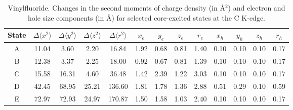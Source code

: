 \documentclass[journal=jctcce,manuscript=article]{achemso}
\begin{document}
 \begin{table}[H]
 \centering
 \caption{Vinylfluoride. Changes in the 
   second moments of charge density (in \AA$^2$) 
   and electron and hole size components (in \AA) for  selected core-excited states at the C K-edge.
   \label{vinylfluoride-sizes-Cedge}}
 \vspace{1em}
 \begin{tabular}{c|cccc|cccc|cccc}
     \hline
    State
     & $\Delta \langle x^2 \rangle$ 
     & $\Delta \langle y^2 \rangle$
     & $\Delta \langle z^2 \rangle$
     & $\Delta \langle r^2 \rangle$
     & $x_e$ 
     & $y_e$ 
     & $z_e$ 
     & $r_e$ 
     & $x_h$ 
     & $y_h$ 
     & $z_h$ 
     & $r_h$ 
     \\
     \hline
     A
     & 11.04 & 3.60 & 2.20 & 16.84
     & 1.92 & 0.68 & 0.81 & 1.40
     & 0.10 & 0.10 & 0.10 & 0.17
     \\
         B 
     & 12.38 & 3.37 & 2.25 & 18.00
     & 0.92 & 0.67 & 0.81 & 1.39
     & 0.10 & 0.10 & 0.10 & 0.17
     \\
             C 
& 15.58 & 16.31 & 4.60 & 36.48
     & 1.42 & 2.39 & 1.22 & 3.03
     & 0.10 & 0.10 & 0.10 & 0.17
     \\
                  D 
& 42.45 & 68.95& 25.21 & 136.60
     & 1.81 & 1.78 & 1.36 & 2.88
     & 0.51 & 0.29 & 0.10 & 0.59
     \\
                  E 
& 72.97 & 72.93 & 24.97 & 170.87
     & 1.50 & 1.58 & 1.03 & 2.40
     & 0.10 & 0.10 & 0.10 & 0.17
     \\
     \hline
 \end{tabular}
 \end{table}
%
\end{document}
